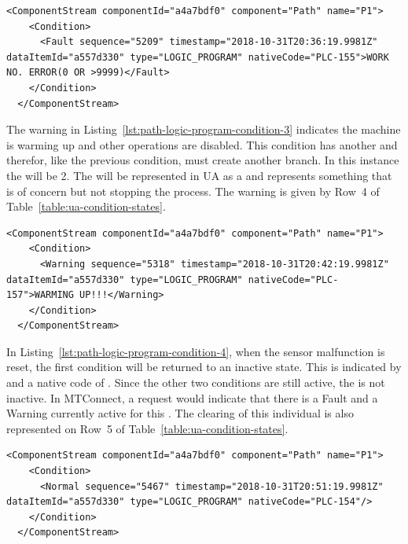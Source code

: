 \begin{lstlisting}[firstnumber=last,escapechar=|,%
    caption={Path Logic Program Second Fault PLC-155},label={lst:path-logic-program-condition-2}]
  <ComponentStream componentId="a4a7bdf0" component="Path" name="P1">
    <Condition>
      <Fault sequence="5209" timestamp="2018-10-31T20:36:19.9981Z" dataItemId="a557d330" type="LOGIC_PROGRAM" nativeCode="PLC-155">WORK NO. ERROR(0 OR >9999)</Fault>
    </Condition>
  </ComponentStream>
\end{lstlisting}

The warning in Listing~\ref{lst:path-logic-program-condition-3} indicates the machine is warming up and other operations are disabled. This condition has another  and therefor, like the previous condition, must create another branch. In this instance the  will be 2. The  will be represented in UA as a  and represents something that is of concern but not stopping the process. The warning is given by Row~4 of Table~\ref{table:ua-condition-states}.

\begin{lstlisting}[firstnumber=last,escapechar=|,%
    caption={Path Logic Program Warning PLC-157},label={lst:path-logic-program-condition-3}]
  <ComponentStream componentId="a4a7bdf0" component="Path" name="P1">
    <Condition>
      <Warning sequence="5318" timestamp="2018-10-31T20:42:19.9981Z" dataItemId="a557d330" type="LOGIC_PROGRAM" nativeCode="PLC-157">WARMING UP!!!</Warning>
    </Condition>
  </ComponentStream>
\end{lstlisting}

In Listing~\ref{lst:path-logic-program-condition-4}, when the sensor malfunction is reset, the first condition will be returned to an inactive state. This is indicated by  and a native code of . Since the other two conditions are still active, the  is not inactive. In MTConnect, a  request would indicate that there is a Fault and a Warning currently active for this . The clearing of this individual  is also represented on Row~5 of Table~\ref{table:ua-condition-states}.

\begin{lstlisting}[firstnumber=last,escapechar=|,%
    caption={Path Logic Program Clear Fault of PLC-154},label={lst:path-logic-program-condition-4}]
  <ComponentStream componentId="a4a7bdf0" component="Path" name="P1">
    <Condition>
      <Normal sequence="5467" timestamp="2018-10-31T20:51:19.9981Z" dataItemId="a557d330" type="LOGIC_PROGRAM" nativeCode="PLC-154"/>
    </Condition>
  </ComponentStream>
\end{lstlisting}

